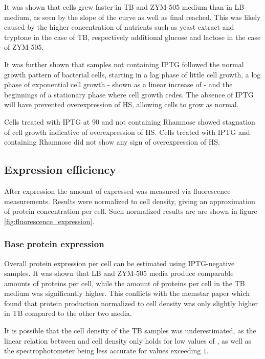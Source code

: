 It was shown that cells grew faster in TB and ZYM-505 medium than in LB medium,
as seen by the slope of the curve as well as final \odbact reached. This was
likely caused by the higher concentration of nutrients such as yeast extract
and tryptone in the case of TB, respectively additional glucose and lactose in
the case of ZYM-505.

It was further shown that samples not containing IPTG followed the normal
growth pattern of bacterial cells, starting in a lag phase of little cell
growth, a log phase of exponential cell growth - shown as a linear increase of
\odbact - and the beginnings of a stationary phase where cell growth cedes. The
absence of IPTG will have prevented overexpression of HS, allowing cells to
grow as normal.

Cells treated with IPTG at \SI{90}{\min} and not containing Rhamnose showed
stagnation of cell growth indicative of overexpression of HS. Cells treated
with IPTG and containing Rhamnose did not show any sign of overexpression of
HS.

\subsection{Expression efficiency}

After expression the amount of expressed \hsdsred{} was measured via fluorescence
measurements. Results were normalized to cell density, giving an approximation
of protein concentration per cell. Such normalized results are are shown in
figure \ref{fig:fluorescence_expression}.

\subsubsection{Base protein expression}

Overall protein expression per cell can be estimated using IPTG-negative
samples. It was shown that LB and ZYM-505 media produce comparable amounts of
proteins per cell, while the amount of proteins per cell in the TB medium was
significantly higher. This conflicts with the memstar paper which found that
protein production normalized to cell density was only slightly higher in TB
compared to the other two media. \cite{memstar}

It is possible that the cell density of the TB samples was underestimated, as
the linear relation between \odbact and cell density only holds for low values
of \odbact, as well as the spectrophotometer being less accurate for values
exceeding $1$.

